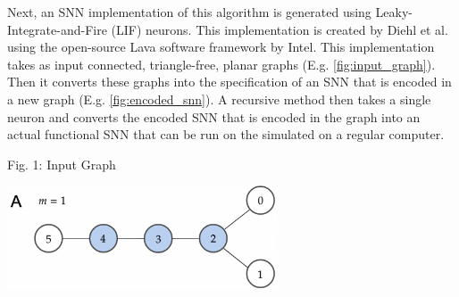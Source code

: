 Next, an SNN implementation of this algorithm is generated using Leaky-Integrate-and-Fire (LIF) neurons. This implementation is created by Diehl et al. \cite{diehl} using the open-source Lava software framework by Intel. This implementation takes as input connected, triangle-free, planar graphs (E.g. \cref{fig:input_graph}). Then it converts these graphs into the specification of an SNN that is encoded in a new graph (E.g. \cref{fig:encoded_snn}). A recursive method then takes a single neuron and converts the encoded SNN that is encoded in the graph into an actual functional SNN that can be run on the simulated on a regular computer.
\begin{rudifig}{\hsize}{Fig. 1: Input Graph}
    
    \hspace{-1em}
    \includegraphics[width=8cm]{latex/Images/input_graph_G_6_0_alternative1.png}
    \label{fig:input_graph}
\end{rudifig}


